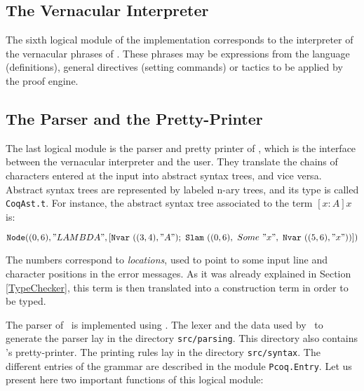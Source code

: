 \subsection{The Vernacular Interpreter}

The sixth logical module of the implementation corresponds to the
interpreter of the vernacular phrases of \Coq. These phrases may be
expressions from the \gallina{} language (definitions), general
directives (setting commands) or tactics to be applied by the proof
engine. 

\subsection[The Parser and the Pretty-Printer]{The Parser and the Pretty-Printer\label{PrettyPrinter}}

The last logical module is the parser and pretty printer of \Coq,
which is the interface between the vernacular interpreter and the
user. They translate the chains of characters entered at the input
into abstract syntax trees, and vice versa. Abstract syntax trees are
represented by labeled n-ary trees, and its type is called
\texttt{CoqAst.t}.  For instance, the abstract syntax tree associated
to the term $[x:A]x$ is:

\begin{displaymath}
\texttt{Node}
 ((0,6), "LAMBDA",
  [\texttt{Nvar}~((3, 4),"A");~\texttt{Slam}~((0,6),~Some~"x",~\texttt{Nvar}~((5,6),"x"))])
\end{displaymath}

The numbers correspond to \textsl{locations}, used to point to some
input line and character positions in the error messages. As it was
already explained in Section \ref{TypeChecker}, this term is then
translated into a construction term in order to be typed.

The parser of \Coq\ is implemented using \camlpppp. The lexer and the data
used by \camlpppp\ to generate the parser lay in the directory
\texttt{src/parsing}.  This directory also contains \Coq's
pretty-printer. The printing rules lay in the directory
\texttt{src/syntax}.  The different entries of the grammar are
described in the module \texttt{Pcoq.Entry}.  Let us present here two
important functions of this logical module:

